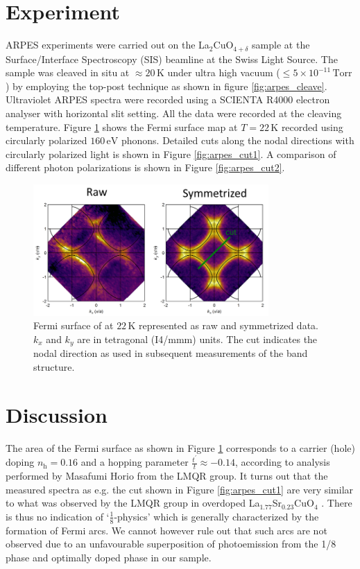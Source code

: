 \section{Experiment}
ARPES experiments were carried out on the La$_2$CuO$_{4+\delta}$ sample at the Surface/Interface Spectroscopy (SIS) beamline at the Swiss Light Source. The sample was cleaved in situ at $\approx 20\,\text{K}$ under ultra high vacuum ($\leq 5 \times 10^{-11}\,\text{Torr}$) by employing the top-post technique as shown in figure \ref{fig:arpes_cleave}. Ultraviolet ARPES spectra were recorded using a SCIENTA R4000 electron analyser with horizontal slit setting. All the data were recorded at the cleaving temperature. Figure \ref{fig:arpes_fs} shows the Fermi surface map at $T=22\,\text{K}$ recorded using circularly polarized $160\,\text{eV}$ phonons.  Detailed cuts along the nodal directions with circularly polarized light is shown in Figure \ref{fig:arpes_cut1}. A comparison of different photon polarizations is shown in Figure \ref{fig:arpes_cut2}.

\begin{figure}
    \centering
    \includegraphics[width=0.8\textwidth]{fig/arpes/fermi_surface.png}
    \caption{Fermi surface of at $22\,\text{K}$ represented as raw and symmetrized data. $k_x$ and $k_y$ are in tetragonal (I4/mmm) units. The cut indicates the nodal direction as used in subsequent measurements of the band structure.}
    \label{fig:arpes_fs}
\end{figure}

\section{Discussion}
The area of the Fermi surface as shown in Figure \ref{fig:arpes_fs} corresponds to a carrier (hole) doping $n_\text{h} = 0.16$ and a hopping parameter $\frac{t^\prime}{t} \approx -0.14$, according to analysis performed by Masafumi Horio from the LMQR group.
It turns out that the measured spectra as e.g. the cut shown in Figure \ref{fig:arpes_cut1} are very similar to what was observed by the LMQR group in overdoped La$_{1.77}$Sr$_{0.23}$CuO$_4$ \cite{Horio2018}. There is thus no indication of `$\frac{1}{8}$-physics' which is generally characterized by the formation of Fermi arcs. We cannot however rule out that such arcs are not observed due to an unfavourable superposition of photoemission from the 1/8 phase and optimally doped phase in our sample.  

